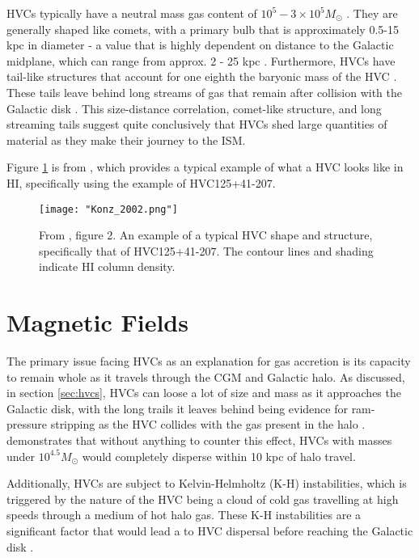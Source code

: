 HVCs typically have a neutral mass gas content of $10^5 - 3\times10^5 M_{\odot}$ \citep{ID19}. They are generally shaped like comets, with a primary bulb that is approximately 0.5-15 kpc in diameter - a value that is highly dependent on distance to the Galactic midplane, which can range from approx. 2 - 25 kpc \citep{ID19, ID13}. Furthermore, HVCs have tail-like structures that account for one eighth the baryonic mass of the HVC \citep{ID13}. These tails leave behind long streams of gas that remain after collision with the Galactic disk \citep{ID19}. This size-distance correlation, comet-like structure, and long streaming tails suggest quite conclusively that HVCs shed large quantities of material as they make their journey to the ISM.


Figure \ref{fig:hvc_example} is from \cite{ID13}, which provides a typical example of what a HVC looks like in HI, specifically using the example of HVC125+41-207.

\begin{figure}
    \texttt{[image: "Konz\_2002.png"]}
    \centering
    \caption{From \cite{ID13}, figure 2. An example of a typical HVC shape and structure, specifically that of HVC125+41-207. The contour lines and shading indicate HI column density.}
    \label{fig:hvc_example}
\end{figure}


\section{Magnetic Fields}
\label{sec:bfields}

The primary issue facing HVCs as an explanation for gas accretion is its capacity to remain whole as it travels through the CGM and Galactic halo. As discussed, in section \ref{sec:hvcs}, HVCs can loose a lot of size and mass as it approaches the Galactic disk, with the long trails it leaves behind being evidence for ram-pressure stripping as the HVC collides with the gas present in the halo \citep{ID11, ID23, ID33}. \cite{ID25} demonstrates that without anything to counter this effect, HVCs with masses under $10^{4.5} M_{\odot}$ would completely disperse within 10 kpc of halo travel.


Additionally, HVCs are subject to Kelvin-Helmholtz (K-H) instabilities, which is triggered by the nature of the HVC being a cloud of cold gas travelling at high speeds through a medium of hot halo gas. These K-H instabilities are a significant factor that would lead a to HVC dispersal before reaching the Galactic disk \citep{ID11, ID23, ID33}.


